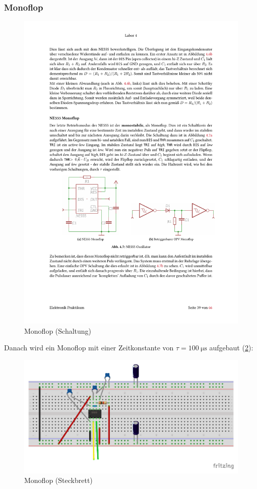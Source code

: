 \subsubsection{Monoflop}

\begin{figure}[H]
  \centering
  \includegraphics[width=0.5\linewidth]{Elektronik-Laborprotokoll_Filter/Abbildungen/Schaltungen_Skript/Schaltung_NE555_Monoflop.pdf}
  \caption{Monoflop (Schaltung)\cite{Skript}}
  \label{fig:Monoflop_Schaltung}
\end{figure}
Danach wird ein Monoflop mit einer Zeitkonstante von $\tau=\SI{100}{\micro\second}$ aufgebaut (\ref{fig:Steckbrett_NE555_3}):

\begin{figure}[H]
  \centering
  \includegraphics[width=0.5\linewidth]{Elektronik-Laborprotokoll_Filter/Abbildungen/Steckbrett_Bilder_Fritzing/Steckbrett_Aufgabe_2.3_NE555__monoflop.pdf}
  \caption{Monoflop (Steckbrett)}
  \label{fig:Steckbrett_NE555_3}
\end{figure}








